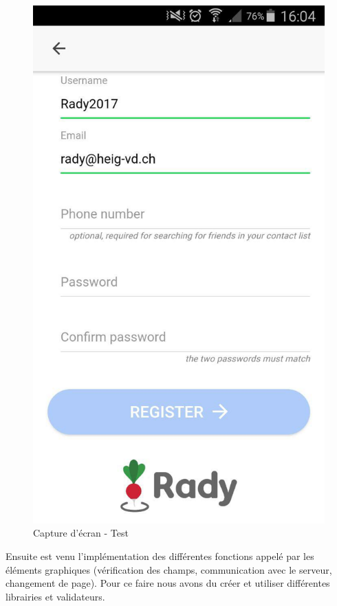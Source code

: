 \documentclass[french]{article}
\begin{document}
\begin{figure}[H]
\begin{minipage}[c]{.46\linewidth}
			\includegraphics[scale=0.20]{../screenshot/screenshot-register.jpg}
			\caption{Capture d'écran - Test}
			\label{Capture d'écran - Test}
		\end{minipage}
		
	\end{figure} 	 
	
	\newpage
	
	Ensuite est venu l'implémentation des différentes fonctions appelé par les éléments graphiques (vérification des champs, communication avec le serveur, changement de page). Pour ce faire nous avons du créer et utiliser différentes librairies et validateurs.
	
\end{document}
